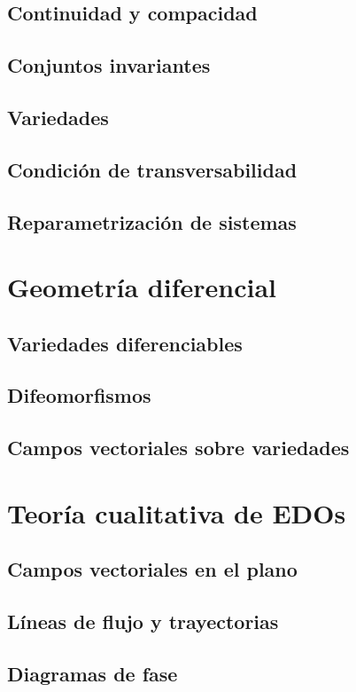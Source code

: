     \subsection{Continuidad y compacidad}
    \subsection{Conjuntos invariantes}
    \subsection{Variedades}
    \subsection{Condición de transversabilidad}
    \subsection{Reparametrización de sistemas}
    
    \section{Geometría diferencial}
    \subsection{Variedades diferenciables}
    \subsection{Difeomorfismos}
    \subsection{Campos vectoriales sobre variedades}
    
    \section{Teoría cualitativa de EDOs}
    \subsection{Campos vectoriales en el plano}
    \subsection{Líneas de flujo y trayectorias}
    \subsection{Diagramas de fase}
